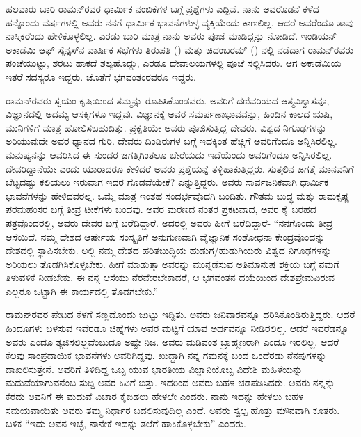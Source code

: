 
ಹಲವಾರು ಬಾರಿ ರಾಮನ್‍ರವರ ಧಾರ್ಮಿಕ ನಂಬಿಕೆಗಳ ಬಗ್ಗೆ ಪ್ರಶ್ನೆಗಳು ಎದ್ದಿವೆ. ನಾನು ಅವರೊಡನೆ ಕಳೆದ ಹನ್ನೊಂದು ವರ್ಷಗಳಲ್ಲಿ ಅವರು ನನಗೆ ಧಾರ್ಮಿಕ ಭಾವನೆಗಳುಳ್ಳ ವ್ಯಕ್ತಿಯೆಂದು ಕಾಣಲಿಲ್ಲ. ಆದರೆ ಅವರೆಂದೂ ತಾವು ನಾಸ್ತಿಕರೆಂದು ಹೇಳಿಕೊಳ್ಳಲಿಲ್ಲ. ಎರಡು ಬಾರಿ ಮಾತ್ರ ನಾನು ಅವರು ಪೂಜೆ ಮಾಡಿದ್ದನ್ನು ನೋಡಿದೆ. ಇಂಡಿಯನ್ ಅಕಾಡೆಮಿ ಆಫ್ ಸೈನ್ಸಸ್‍ನ ವಾರ್ಷಿಕ ಸಭೆಗಳು ತಿರುಪತಿ () ಮತ್ತು ಚಿದಂಬರಮ್ () ನಲ್ಲಿ ನಡೆದಾಗ ರಾಮನ್‍ರವರು ಪಂಚೆಯುಟ್ಟು, ಶರಟು ಹಾಕದೆ ಶಲ್ಯಹೊದ್ದು, ಎರಡೂ ದೇವಾಲಯಗಳಲ್ಲಿ ಪೂಜೆ ಸಲ್ಲಿಸಿದರು. ಆಗ ಅಕಾಡೆಮಿಯ ಇತರೆ ಸದಸ್ಯರೂ ಇದ್ದರು. ಜೊತೆಗೆ ಭಗವಂತಂರವರೂ ಇದ್ದರು.

ರಾಮನ್‍ರವರು ಸ್ವಯಂ ಕೃಷಿಯಿಂದ ತಮ್ಮನ್ನು ರೂಪಿಸಿಕೊಂಡವರು. ಅವರಿಗೆ ದಣಿವರಿಯದ ಆತ್ಮವಿಶ್ವಾಸವೂ, ವಿಜ್ಞಾನದಲ್ಲಿ ಅದಮ್ಯ ಆಸಕ್ತಿಗಳೂ ಇದ್ದವು. ವಿಜ್ಞಾನಕ್ಕೆ ಅವರ ಸಮರ್ಪಣಾಭಾವವನ್ನು, ಹಿಂದಿನ ಕಾಲದ ಋಷಿ, ಮುನಿಗಳಿಗೆ ಮಾತ್ರ ಹೋಲಿಸಬಹುದಿತ್ತು. ಪ್ರಕೃತಿಯೇ ಅವರು ಪೂಜಿಸುತ್ತಿದ್ದ ದೇವರು. ವಿಶ್ವದ ನಿಗೂಢಗಳನ್ನು ಅರಿಯುವುದೇ ಅವರ ಧ್ಯಾನದ ಗುರಿ. ದೇವರು ದಿಂಡಿರುಗಳ ಬಗ್ಗೆ ಇದಕ್ಕಿಂತ ಹೆಚ್ಚಿಗೆ ಅವರಿಗೆಂದೂ ಅನ್ನಿಸಿರಲಿಲ್ಲ. ಮನುಷ್ಯನನ್ನು ಆವರಿಸಿದ ಈ ಸುಂದರ ಜಗತ್ತಿಗಿಂತಲೂ ಬೇರೆಯದು ಇದೆಯೆಂದು ಅವರಿಗೆಂದೂ ಅನ್ನಿಸಿರಲಿಲ್ಲ. ದೇವರಿದ್ದಾನೆಯೇ ಎಂದು ಯಾರಾದರೂ ಕೇಳಿದರೆ ಅವರು ಪ್ರಶ್ನೆಯನ್ನೆ ತಳ್ಳಿಹಾಕುತ್ತಿದ್ದರು. ಸುತ್ತಲಿನ ಜಗತ್ತೆ ಮಾನವನಿಗೆ ಬೆಟ್ಟದಷ್ಟು ಕಲಿಯಲು ಇರುವಾಗ ಇದರ ಗೊಡವೆಯೇಕೆ? ಎನ್ನುತ್ತಿದ್ದರು. ಅವರು ಸಾರ್ವಜನಿಕವಾಗಿ ಧಾರ್ಮಿಕ ಭಾವನೆಗಳನ್ನು ಹೇಳಿದವರಲ್ಲ. ಒಮ್ಮೆ ಮಾತ್ರ ಇಂತಹ ಸಂದರ್ಭವೊದಗಿ ಬಂದಿತು. ಗೌತಮ ಬುದ್ಧ ಮತ್ತು ರಾಮಕೃಷ್ಣ ಪರಮಹಂಸರ ಬಗ್ಗೆ ತೀವ್ರ ಟೀಕೆಗಳು ಬಂದವು. ಅವರ ಮರಣದ ನಂತರ ಪ್ರಕಟವಾದ, ಅವರ ಕೈ ಬರಹದ ಪತ್ರವೊಂದರಲ್ಲಿ, ಅವರು ದೇವರ ಬಗ್ಗೆ ಬರೆದಿದ್ದಾರೆ. ಅದರಲ್ಲಿ ಅವರು ಹೀಗೆ ಬರೆದಿದ್ದಾರೆ- “ನನಗೊಂದು ತೀವ್ರ ಆಸೆಯಿದೆ. ನಮ್ಮ ದೇಶದ ಆರ್ಷೇಯ ಸಂಸ್ಕೃತಿಗೆ ಅನುಗುಣವಾಗಿ ವೈಜ್ಞಾನಿಕ ಸಂಶೋಧನಾ ಕೇಂದ್ರವೊಂದನ್ನು ದೇಶದಲ್ಲಿ ಸ್ಥಾಪಿಸಬೇಕು. ಅಲ್ಲಿ ನಮ್ಮ ದೇಶದ ಹರಿತಬುದ್ಧಿಯ ಹುಡುಗ/ಹುಡುಗಿಯರು ವಿಶ್ವದ ನಿಗೂಢಗಳನ್ನು ಅರಿಯಲು ತೊಡಗಿಸಿಕೊಳ್ಳಬೇಕು. ಹೀಗೆ ಮಾಡುತ್ತಾ ಅವರನ್ನು ಮುನ್ನಡೆಸುವ ಅತಿಮಾನುಷ ಶಕ್ತಿಯ ಬಗ್ಗೆ ನಮಗೆ ತಿಳುವಳಿಕೆ ನೀಡಬೇಕು. ಈ ನನ್ನ ಆಸೆಯು ನೆರವೇರಬೇಕಾದರೆ, ಆ ಭಗವಂತನ ದಯೆಯಿಂದ ದೇಶಪ್ರೇಮವಿರುವ ಎಲ್ಲರೂ ಒಟ್ಟಾಗಿ ಈ ಕಾರ್ಯದಲ್ಲಿ ತೊಡಗಬೇಕು.”

ರಾಮನ್‍ರವರ ಪೇಟದ ಕೆಳಗೆ ಸಣ್ಣದೊಂದು ಜುಟ್ಟು ಇದ್ದಿತು. ಅವರು ಜನಿವಾರವನ್ನೂ ಧರಿಸಿಕೊಂಡಿರುತ್ತಿದ್ದರು. ಆದರೆ ಹಿಂದೂಗಳು ಬಳಸುವ ಇವೆರಡೂ ಚಿಹ್ನೆಗಳು ಅವರ ಮಟ್ಟಿಗೆ ಯಾವ ಅರ್ಥವನ್ನೂ ನೀಡಿರಲಿಲ್ಲ. ಆದರೆ ಇವರೆಡನ್ನೂ ಅವರು ಎಂದೂ ತ್ಯಜಿಸಲಿಲ್ಲವೆಂಬುದೂ ಅಷ್ಟೇ ನಿಜ. ಅವರು ಮಡಿವಂತ ಬ್ರಾಹ್ಮಣರಾಗಿ ಎಂದೂ ಇರಲಿಲ್ಲ. ಆದರೆ ಕೆಲವು ಸಾಂಪ್ರದಾಯಿಕ ಭಾವನೆಗಳು ಅವರಿಗಿದ್ದವು. ಖುದ್ದಾಗಿ ನನ್ನ ಗಮನಕ್ಕೆ ಬಂದ ಒಂದೆರಡು ನೆನಪುಗಳನ್ನು ದಾಖಲಿಸುತ್ತೇನೆ. ಅವರಿಗೆ ತಿಳಿದಿದ್ದ ಒಬ್ಬ ಯುವ ಭಾರತೀಯ ವಿಜ್ಞಾನಿಯೊಬ್ಬ ವಿದೇಶಿ ಮಹಿಳೆಯನ್ನು ಮದುವೆಯಾಗುವನೆಂಬ ಸುದ್ದಿ ಅವರ ಕಿವಿಗೆ ಬಿತ್ತು. ಇದರಿಂದ ಅವರು ಬಹಳ ಚಡಪಡಿಸಿದರು. ಅವರು ನನ್ನನ್ನು ಕೆರದು ಅವನಿಗೆ ಈ ಮದುವೆ ವಿಚಾರ ಕೈಬಿಡಲು ಹೇಳಲೇ ಎಂದರು. ನಾನು ಇದನ್ನು ಹೇಳಲು ಬಹಳ ಸಮಯವಾಯಿತು ಅವರು ತಮ್ಮ ನಿರ್ಧಾರ ಬದಲಿಸುವುದಿಲ್ಲ ಎಂದೆ. ಅವರು ಸ್ವಲ್ಪ ಹೊತ್ತು ಮೌನವಾಗಿ ಕೂತರು. ಬಳಿಕ “ಇದು ಅವನ ಇಚ್ಛೆ, ನಾನೇಕೆ ಇದನ್ನು ತಲೆಗೆ ಹಾಕಿಕೊಳ್ಳಬೇಕು” ಎಂದರು.

